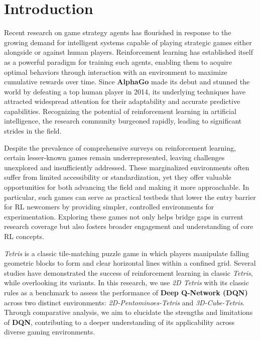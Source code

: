 \section{Introduction}
Recent research on game strategy agents has flourished in response to the growing demand for intelligent systems capable of playing strategic games either alongside or against human players. 
Reinforcement learning has established itself as a powerful paradigm for training such agents, enabling them to acquire optimal behaviors through interaction with an environment to maximize cumulative rewards over time.
Since \textbf{AlphaGo} \cite{Silver2016} made its debut and stunned the world by defeating a top human player in 2014, its underlying techniques have attracted widespread attention for their adaptability and accurate predictive capabilities. 
Recognizing the potential of reinforcement learning in artificial intelligence, the research community burgeoned rapidly, leading to significant strides in the field. 

Despite the prevalence of comprehensive surveys on reinforcement learning, certain lesser-known games remain underrepresented, leaving challenges unexplored and insufficiently addressed. 
These marginalized environments often suffer from limited accessibility or standardization, yet they offer valuable opportunities for both advancing the field and making it more approachable. 
In particular, such games can serve as practical testbeds that lower the entry barrier for RL newcomers by providing simpler, controlled environments for experimentation. 
Exploring these games not only helps bridge gaps in current research coverage but also fosters broader engagement and understanding of core RL concepts.

\emph{Tetris} is a classic tile-matching puzzle game in which players manipulate falling geometric blocks to form and clear horizontal lines within a confined grid. 
Several studies \cite{algorta2019gametetrismachinelearning, chen2021playing} have demonstrated the success of reinforcement learning in classic \emph{Tetris}, while overlooking its variants.
In this research, we use \emph{2D Tetris} with its classic rules as a benchmark to assess the performance of \textbf{Deep Q-Network (DQN)} \cite{mnih2013playingatarideepreinforcement} across two distinct environments: \emph{2D-Pentominoes-Tetris} and \emph{3D-Cube-Tetris}. 
Through comparative analysis, we aim to elucidate the strengths and limitations of \textbf{DQN}, contributing to a deeper understanding of its applicability across diverse gaming environments.